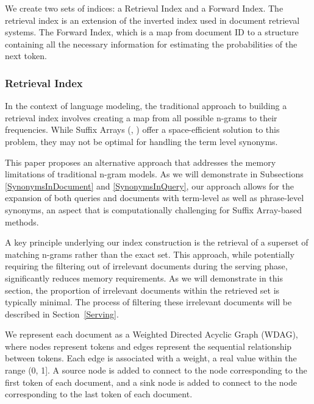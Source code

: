 We create two sets of indices: a Retrieval Index and a Forward Index. The retrieval index is an extension of the inverted index \cite{InvertedIndex} used in document retrieval systems. The Forward Index, which is a map from document ID to a structure containing all the necessary information for estimating the probabilities of the next token. 

  \subsubsection{Retrieval Index}
  In the context of language modeling, the traditional approach to building a retrieval index involves creating a map from all possible n-grams to their frequencies. While Suffix Arrays (\cite{stehouwer2010using}, \cite{kennington2012suffix}) offer a space-efficient solution to this problem, they may not be optimal for handling the term level synonyms.

  This paper proposes an alternative approach that addresses the memory limitations of traditional n-gram models. As we will demonstrate in Subsections \ref{SynonymsInDocument} and \ref{SynonymsInQuery}, our approach allows for the expansion of both queries and documents with term-level as well as phrase-level synonyms, an aspect that is computationally challenging for Suffix Array-based methods.

  A key principle underlying our index construction is the retrieval of a superset of matching n-grams rather than the exact set. This approach, while potentially requiring the filtering out of irrelevant documents during the serving phase, significantly reduces memory requirements. As we will demonstrate in this section, the proportion of irrelevant documents within the retrieved set is typically minimal. The process of filtering these irrelevant documents will be described in Section~\ref{Serving}.

  We represent each document as a Weighted Directed Acyclic Graph (WDAG), where nodes represent tokens and edges represent the sequential relationship between tokens. Each edge is associated with a weight, a real value within the range (0, 1]. A source node is added to connect to the node corresponding to the first token of each document, and a sink node is added to connect to the node corresponding to the last token of each document.

